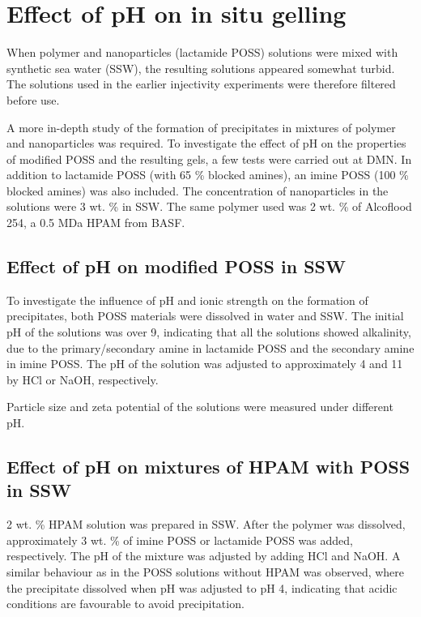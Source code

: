 \section{Effect of pH on in situ gelling}

When polymer and nanoparticles (lactamide POSS) solutions were mixed with synthetic sea water (SSW), the resulting solutions appeared somewhat turbid. The solutions used in the earlier injectivity experiments were therefore filtered before use. 

A more in-depth study of the formation of precipitates in mixtures of polymer and nanoparticles was required. To investigate the effect of pH on the properties of modified POSS and the resulting gels, a few tests were carried out at DMN. In addition to lactamide POSS (with 65 \% blocked amines), an imine POSS (100 \% blocked amines) was also included. The concentration of nanoparticles in the solutions were 3 wt. \% in SSW. The same polymer used was 2 wt. \% of Alcoflood 254, a 0.5 MDa HPAM from BASF.


\subsection{Effect of pH on modified POSS in SSW}
To investigate the influence of pH and ionic strength on the formation of precipitates, both POSS materials were dissolved in water and SSW. The initial pH of the solutions was over 9, indicating that all the solutions showed alkalinity, due to the primary/secondary amine in lactamide POSS and the secondary amine in imine POSS. The pH of the solution was adjusted to approximately 4 and 11 by HCl or NaOH, respectively.

Particle size and zeta potential of the solutions were measured under different pH.

\subsection{Effect of pH on mixtures of HPAM with POSS in SSW} 
2 wt. \% HPAM solution was prepared in SSW. After the polymer was dissolved, approximately 3 wt. \% of imine POSS or lactamide POSS was added, respectively. The pH of the mixture was adjusted by adding HCl and NaOH. A similar behaviour as in the POSS solutions without HPAM was observed, where the precipitate dissolved when pH was adjusted to pH 4, indicating that acidic conditions are favourable to avoid precipitation.  

